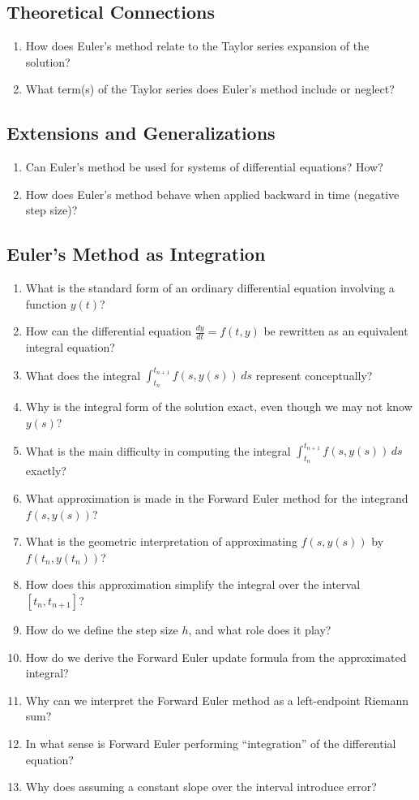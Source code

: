 \subsection{Theoretical Connections}
\begin{enumerate}[resume]
  \item How does Euler's method relate to the Taylor series expansion of the solution?
  \item What term(s) of the Taylor series does Euler's method include or neglect?
\end{enumerate}

\subsection{Extensions and Generalizations}
\begin{enumerate}[resume]
  \item Can Euler's method be used for systems of differential equations? How?
  \item How does Euler's method behave when applied backward in time (negative step size)?
\end{enumerate}

\subsection{Euler's Method as Integration}
\begin{enumerate}[resume]
  \item What is the standard form of an ordinary differential equation involving a function \( y(t) \)?
  \item How can the differential equation \( \frac{dy}{dt} = f(t,y) \) be rewritten as an equivalent integral equation?
  \item What does the integral \( \int_{t_n}^{t_{n+1}} f(s, y(s))\,ds \) represent conceptually?
  \item Why is the integral form of the solution exact, even though we may not know \( y(s) \)?
  \item What is the main difficulty in computing the integral \( \int_{t_n}^{t_{n+1}} f(s, y(s))\,ds \) exactly?
  \item What approximation is made in the Forward Euler method for the integrand \( f(s, y(s)) \)?
  \item What is the geometric interpretation of approximating \( f(s, y(s)) \) by \( f(t_n, y(t_n)) \)?
  \item How does this approximation simplify the integral over the interval \( [t_n, t_{n+1}] \)?
  \item How do we define the step size \( h \), and what role does it play?
  \item How do we derive the Forward Euler update formula from the approximated integral?
  \item Why can we interpret the Forward Euler method as a left-endpoint Riemann sum?
  \item In what sense is Forward Euler performing “integration” of the differential equation?
  \item Why does assuming a constant slope over the interval introduce error?
\end{enumerate}
